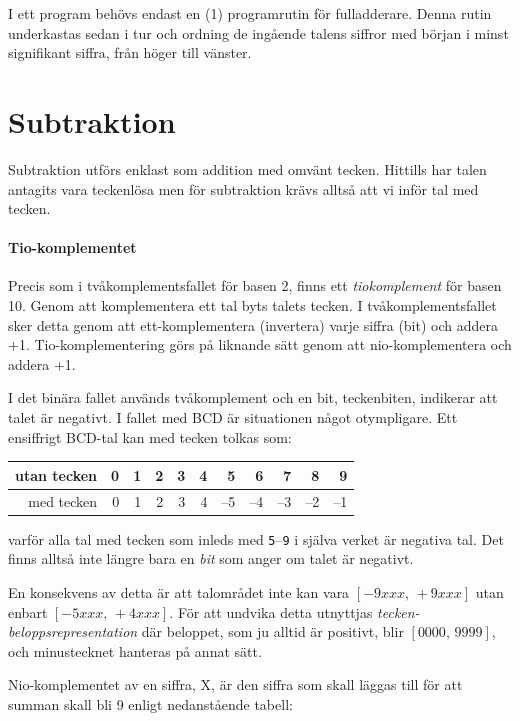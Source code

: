\documentclass[oneside,10pt,a4paper,swedish]{scrbook}
\newcommand{\asm}[1]{\texttt{#1}}
\begin{document}
I ett program behövs endast en (1) programrutin för fulladderare. Denna rutin underkastas sedan i tur och ordning de ingående talens siffror med början i minst signifikant siffra, från höger till vänster.


\section{Subtraktion} Subtraktion utförs enklast som addition med omvänt tecken. Hittills har talen antagits vara teckenlösa men för subtraktion krävs alltså att vi inför tal med tecken. 

\paragraph{Tio-komplementet} Precis som i tvåkomplementsfallet för basen 2, finns ett \emph{tiokomplement} för basen 10. Genom att komplementera ett tal byts talets tecken. I tvåkomplementsfallet sker detta genom att ett-komplementera (invertera) varje siffra (bit) och addera +1. Tio-komplementering görs på liknande sätt genom att nio-komplementera och addera +1.

I det binära fallet används tvåkomplement och en bit, teckenbiten, indikerar att talet är negativt. I fallet med BCD är situationen något otympligare. Ett ensiffrigt BCD-tal kan med tecken tolkas som:


\begin{center}
\begin{tabular}{r|rrrrrrrrrr|}
 utan tecken    & 0 & 1 & 2 & 3 & 4 & 5 & 6 & 7 & 8 & 9 \\
 \hline
med tecken      & 0 & 1 & 2 & 3 & 4 & --5 & --4 & --3 & --2 & --1 \\
 \end{tabular}
\end{center}

varför alla tal med tecken som inleds med \asm{5}--\asm{9} i själva verket är negativa tal. Det finns alltså inte längre bara en \emph{bit} som anger om talet är negativt.

En konsekvens av detta är att talområdet inte kan vara $\left[-9xxx,\,+9xxx\right]$ utan enbart $\left[-5xxx,\,+4xxx\right]$. För att undvika detta utnyttjas \emph{tecken-beloppsrepresentation} där beloppet, som ju alltid är positivt, blir $\left[0000,\,9999\right]$, och minustecknet hanteras på annat sätt.


Nio-komplementet av en siffra, X, är den siffra som skall läggas till för att summan skall bli 9 enligt nedanstående tabell:
\end{document}
